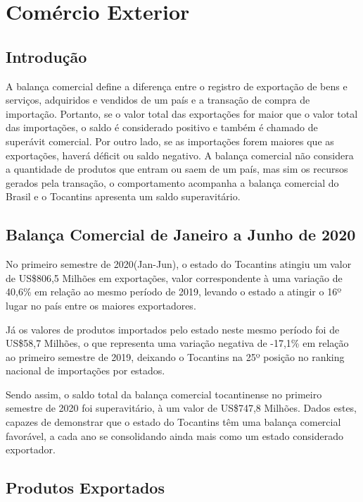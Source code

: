 \chapter{Comércio Exterior}
\section{Introdução}
\par A balança comercial define a diferença entre o registro de exportação de bens e serviços, adquiridos e vendidos de um país e a transação de compra de importação. Portanto, se o valor total das exportações for maior que o valor total das importações, o saldo é considerado positivo e também é chamado de superávit comercial. Por outro lado, se as importações forem maiores que as exportações, haverá déficit ou saldo negativo. A balança comercial não considera a quantidade de produtos que entram ou saem de um país, mas sim os recursos gerados pela transação, o comportamento acompanha a balança comercial do Brasil e o Tocantins apresenta um saldo superavitário.

\section{Balança Comercial de Janeiro a Junho de 2020}
\par No primeiro semestre de 2020(Jan-Jun), o estado do Tocantins atingiu um valor de US\$806,5 Milhões em exportações, valor correspondente à uma variação de 40,6\% em relação ao mesmo período de 2019, levando o estado a atingir o 16º lugar no país entre os maiores exportadores. 

\par Já os valores de produtos importados pelo estado neste mesmo período foi de US\$58,7 Milhões, o que representa uma variação negativa de -17,1\% em relação ao primeiro semestre de 2019, deixando o Tocantins na 25º posição no ranking nacional de importações por estados.

\par Sendo assim, o saldo total da balança comercial tocantinense no primeiro semestre de 2020 foi superavitário, à um valor de US\$747,8 Milhões. Dados estes, capazes de demonstrar que o estado do Tocantins têm uma balança comercial favorável, a cada ano se consolidando ainda mais como um estado considerado exportador.

\section{Produtos Exportados}
